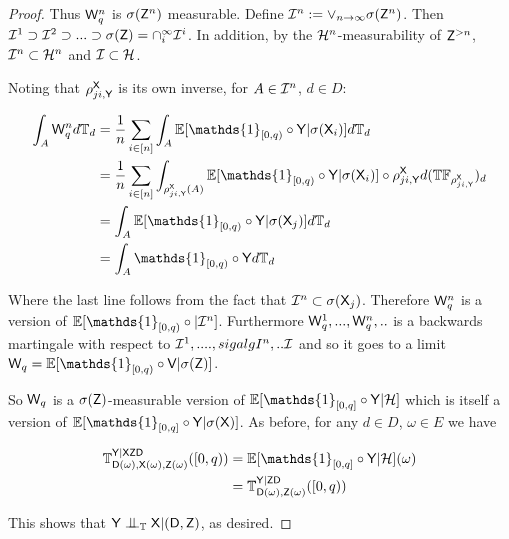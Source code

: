 \begin{proof}
Thus $\mathsf{W}_q^n$ is $\sigma(\mathsf{Z}^n)$ measurable. Define $\mathcal{I}^n:=\vee_{n\to\infty} \sigma(\mathsf{Z}^n)$. Then $\mathcal{I}^1\supset\mathcal{I}^2\supset...\supset\sigma(\mathsf{Z})=\cap_{i}^\infty \mathcal{I}^i$. In addition, by the $\mathcal{H}^n$-measurability of $\mathsf{Z}^{>n}$, $\mathcal{I}^n\subset\mathcal{H}^n$ and $\mathcal{I}\subset\mathcal{H}$.

Noting that $\rho^{\mathsf{X}}_{ji,\mathsf{Y}}$ is its own inverse, for $A\in\mathcal{I}^n$, $d\in D$:

\begin{align}
    \int_A \RV{W}_q^n d\kernel{T}_d &= \frac{1}{n}\sum_{i\in[n]} \int_A \mathbb{E}[\mathds{1}_{[0,q)}\circ\RV{Y}|\sigma(\RV{X}_i)] d\kernel{T}_d\\
                                  &= \frac{1}{n}\sum_{i\in[n]} \int_{\rho^{\RV{X}}_{ji,\RV{Y}}(A)} \mathbb{E}[\mathds{1}_{[0,q)}\circ\RV{Y}|\sigma(\RV{X}_i)]\circ\rho^{\RV{X}}_{ji,\RV{Y}}d(\kernel{T}\kernel{F}_{\rho^{\RV{X}}_{ji,\RV{Y}}})_d\\
                                  &= \int_{A} \mathbb{E}[\mathds{1}_{[0,q)}\circ \RV{Y} |\sigma(\RV{X}_j)]d\kernel{T}_d\\
                                  &= \int_{A} \mathds{1}_{[0,q)}\circ \RV{Y} d\kernel{T}_d
\end{align}

Where the last line follows from the fact that $\mathcal{I}^n\subset \sigma(\mathsf{X}_j)$. Therefore $\mathsf{W}^n_q$ is a version of $\mathbb{E}[\mathds{1}_{[0,q)}\circ|\sigalg{I}^n]$. Furthermore $\mathsf{W}^1_q,...,\mathsf{W}^n_q,..$ is a backwards martingale with respect to $\mathcal{I}^1,....,sigalg{I}^n,..\mathcal{I}$ and so it goes to a limit $\RV{W}_q=\mathbb{E}[\mathds{1}_{[0,q)}\circ \RV{V} |\sigma(\RV{Z})]$.

So $\mathsf{W}_q$ is a $\sigma(\mathsf{Z})$-measurable version of $\mathbb{E}[\mathds{1}_{[0,q]}\circ\RV{Y}|\sigalg{H}]$ which is itself a version of $\mathbb{E}[\mathds{1}_{[0,q]}\circ\RV{Y}|\sigma(\RV{X})]$. As before, for any $d\in D$, $\omega\in E$ we have

\begin{align}
    \kernel{T}_{\RV{D}(\omega),\RV{X}(\omega),\RV{Z}(\omega)}^{\RV{Y}|\RV{X}\RV{Z}\RV{D}}([0,q)) &= \mathbb{E}[\mathds{1}_{[0,q]}\circ\RV{Y}|\sigalg{H}](\omega)\\
                                                                                                 &= \kernel{T}_{\RV{D}(\omega),\RV{Z}(\omega)}^{\RV{Y}|\RV{Z}\RV{D}}([0,q))
\end{align}

This shows that $\RV{Y}\CI_{\kernel{T}} \RV{X}|(\RV{D},\RV{Z})$, as desired.

\end{proof}

